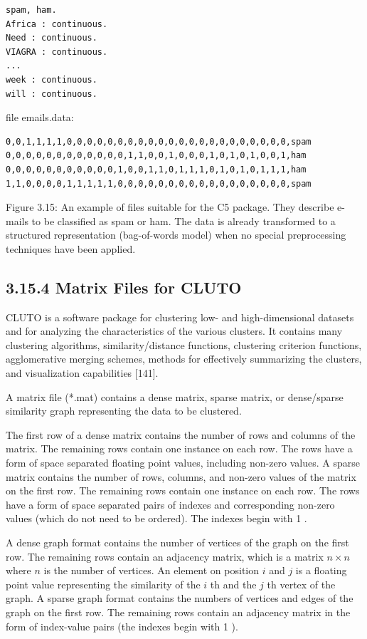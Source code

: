 \documentclass[10pt]{book}
\begin{document}
\begin{verbatim}
spam, ham.
Africa : continuous.
Need : continuous.
VIAGRA : continuous.
...
week : continuous.
will : continuous.
\end{verbatim}

file emails.data:

\begin{verbatim}
0,0,1,1,1,1,0,0,0,0,0,0,0,0,0,0,0,0,0,0,0,0,0,0,0,0,0,0,spam
0,0,0,0,0,0,0,0,0,0,0,0,1,1,0,0,1,0,0,0,1,0,1,0,1,0,0,1,ham
0,0,0,0,0,0,0,0,0,0,0,1,0,0,1,1,0,1,1,1,0,1,0,1,0,1,1,1,ham
1,1,0,0,0,0,1,1,1,1,1,0,0,0,0,0,0,0,0,0,0,0,0,0,0,0,0,0,spam
\end{verbatim}

Figure 3.15: An example of files suitable for the C5 package. They describe e-mails to be classified as spam or ham. The data is already transformed to a structured representation (bag-of-words model) when no special preprocessing techniques have been applied.

\subsection*{3.15.4 Matrix Files for CLUTO}
CLUTO is a software package for clustering low- and high-dimensional datasets and for analyzing the characteristics of the various clusters. It contains many clustering algorithms, similarity/distance functions, clustering criterion functions, agglomerative merging schemes, methods for effectively summarizing the clusters, and visualization capabilities [141].

A matrix file (*.mat) contains a dense matrix, sparse matrix, or dense/sparse similarity graph representing the data to be clustered.

The first row of a dense matrix contains the number of rows and columns of the matrix. The remaining rows contain one instance on each row. The rows have a form of space separated floating point values, including non-zero values. A sparse matrix contains the number of rows, columns, and non-zero values of the matrix on the first row. The remaining rows contain one instance on each row. The rows have a form of space separated pairs of indexes and corresponding non-zero values (which do not need to be ordered). The indexes begin with 1 .

A dense graph format contains the number of vertices of the graph on the first row. The remaining rows contain an adjacency matrix, which is a matrix $n \times n$ where $n$ is the number of vertices. An element on position $i$ and $j$ is a floating point value representing the similarity of the $i$ th and the $j$ th vertex of the graph. A sparse graph format contains the numbers of vertices and edges of the graph on the first row. The remaining rows contain an adjacency matrix in the form of index-value pairs (the indexes begin with 1 ).
\end{document}
